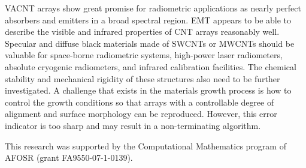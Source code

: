 \documentclass[article,authoryear,jfv]{beg_32}             %
\begin{document}
VACNT arrays show great promise for radiometric applications as nearly
perfect absorbers and emitters in a broad spectral region. EMT appears to be
able to describe the visible and infrared properties of CNT arrays
reasonably well. Specular and diffuse black materials made of SWCNTs or
MWCNTs should be valuable for space-borne radiometric systems, high-power
laser radiometers, absolute cryogenic radiometers, and infrared calibration
facilities. The chemical stability and mechanical rigidity of these
structures also need to be further investigated.
A challenge that exists in
the materials growth process is how to control the growth conditions so that
arrays with a controllable degree of alignment and surface morphology can be
reproduced.  However, this error indicator is too sharp and may
result in a non-terminating algorithm.







\acknowledgements

This research was supported by the Computational Mathematics program of
AFOSR (grant FA9550-07-1-0139).















\end{document}
